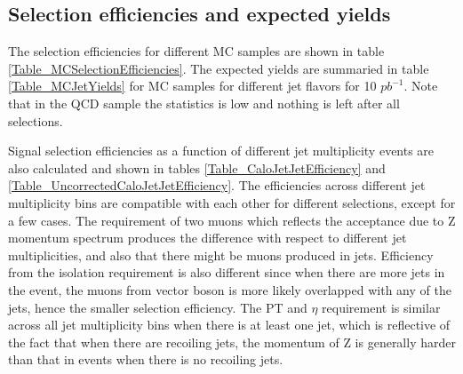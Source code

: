 \documentclass{cmspaper}
\begin{document}
\subsection{Selection efficiencies and expected yields}

The selection efficiencies for different MC samples are shown in table \ref{Table_MCSelectionEfficiencies}.
The expected yields are summaried in table \ref{Table_MCJetYields} for MC samples for different jet flavors for 10 $pb^{-1}$.
Note that in the QCD sample the statistics is low and nothing is left after all selections.

Signal selection efficiencies as a function of different jet multiplicity events are also calculated and shown in tables
\ref{Table_CaloJetJetEfficiency} and \ref{Table_UncorrectedCaloJetJetEfficiency}.
The efficiencies across different jet multiplicity bins are compatible with each other for different selections, except for a few cases.
The requirement of two muons which reflects the acceptance due to Z momentum spectrum produces the difference with respect to different jet multiplicities,
and also that there might be muons produced in jets.
Efficiency from the isolation requirement is also different since when there are more jets in the event,
the muons from vector boson is more likely overlapped with any of the jets, hence the smaller selection efficiency.
The PT and $\eta$ requirement is similar across all jet multiplicity bins when there is at least one jet,
which is reflective of the fact that when there are recoiling jets, the momentum of Z is generally harder than that in events when there is no recoiling jets.
\end{document}
